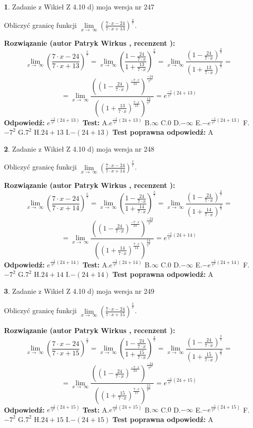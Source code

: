 \documentclass[12pt, a4paper]{article}
\theoremstyle{definition} %
\newtheorem{zad}{}
\newcommand{\zadStart}[1]{\begin{zad}#1\newline}
\newcommand{\zadStop}{\end{zad}}
\newcommand{\rozwStart}[2]{\noindent \textbf{Rozwiązanie (autor #1 , recenzent #2): }\newline}
\newcommand{\rozwStop}{\newline}
\newcommand{\odpStart}{\noindent \textbf{Odpowiedź:}\newline}
\newcommand{\odpStop}{\newline}
\newcommand{\testStart}{\noindent \textbf{Test:}\newline}
\newcommand{\testStop}{\newline}
\newcommand{\kluczStart}{\noindent \textbf{Test poprawna odpowiedź:}\newline}
\newcommand{\kluczStop}{\newline}
\begin{document}
\zadStart{Zadanie z Wikieł Z 4.10 d) moja wersja nr 247}


Obliczyć granicę funkcji  $\lim\limits_{x\to\ \infty}(\frac{7\cdot x-24}{7\cdot x+13})^{\frac{x}{7}}$.
\zadStop
\rozwStart{Patryk Wirkus}{}
$$\lim\limits_{x\to\ \infty}(\frac{7\cdot x-24}{7\cdot x+13})^{\frac{x}{7}} = \lim\limits_{x\to\ \infty}(\frac{1-\frac{24}{7\cdot x}}{1+\frac{13}{7\cdot x}})^{\frac{x}{7}}=\lim\limits_{x\to\ \infty}\frac{(1-\frac{24}{7\cdot x})^{\frac{x}{7}}}{(1+\frac{13}{7\cdot x})^{\frac{x}{7}}}=$$
$$=\lim\limits_{x\to\ \infty}\frac{((1-\frac{24}{7\cdot x})^{\frac{-7\cdot x}{24}})^{\frac{-24}{7^{2}}}}{((1+\frac{13}{7\cdot x})^{\frac{7\cdot x}{13}})^{\frac{13}{7^{2}}}}=e^{\frac{-1}{7^{2}}(24+13)}$$
\rozwStop
\odpStart
$e^{\frac{-1}{7^{2}}(24+13)}$
\odpStop
\testStart
A.$e^{\frac{-1}{7^{2}}(24+13)}$ B.$\infty$ C.$0$ D.$-\infty$ E.$-e^{\frac{-1}{7^{2}}(24+13)}$
F.$-7^{2}$ G.$7^{2}$
H.$24+13$
I.$-(24+13)$
\testStop
\kluczStart
A
\kluczStop



\zadStart{Zadanie z Wikieł Z 4.10 d) moja wersja nr 248}


Obliczyć granicę funkcji  $\lim\limits_{x\to\ \infty}(\frac{7\cdot x-24}{7\cdot x+14})^{\frac{x}{7}}$.
\zadStop
\rozwStart{Patryk Wirkus}{}
$$\lim\limits_{x\to\ \infty}(\frac{7\cdot x-24}{7\cdot x+14})^{\frac{x}{7}} = \lim\limits_{x\to\ \infty}(\frac{1-\frac{24}{7\cdot x}}{1+\frac{14}{7\cdot x}})^{\frac{x}{7}}=\lim\limits_{x\to\ \infty}\frac{(1-\frac{24}{7\cdot x})^{\frac{x}{7}}}{(1+\frac{14}{7\cdot x})^{\frac{x}{7}}}=$$
$$=\lim\limits_{x\to\ \infty}\frac{((1-\frac{24}{7\cdot x})^{\frac{-7\cdot x}{24}})^{\frac{-24}{7^{2}}}}{((1+\frac{14}{7\cdot x})^{\frac{7\cdot x}{14}})^{\frac{14}{7^{2}}}}=e^{\frac{-1}{7^{2}}(24+14)}$$
\rozwStop
\odpStart
$e^{\frac{-1}{7^{2}}(24+14)}$
\odpStop
\testStart
A.$e^{\frac{-1}{7^{2}}(24+14)}$ B.$\infty$ C.$0$ D.$-\infty$ E.$-e^{\frac{-1}{7^{2}}(24+14)}$
F.$-7^{2}$ G.$7^{2}$
H.$24+14$
I.$-(24+14)$
\testStop
\kluczStart
A
\kluczStop



\zadStart{Zadanie z Wikieł Z 4.10 d) moja wersja nr 249}


Obliczyć granicę funkcji  $\lim\limits_{x\to\ \infty}(\frac{7\cdot x-24}{7\cdot x+15})^{\frac{x}{7}}$.
\zadStop
\rozwStart{Patryk Wirkus}{}
$$\lim\limits_{x\to\ \infty}(\frac{7\cdot x-24}{7\cdot x+15})^{\frac{x}{7}} = \lim\limits_{x\to\ \infty}(\frac{1-\frac{24}{7\cdot x}}{1+\frac{15}{7\cdot x}})^{\frac{x}{7}}=\lim\limits_{x\to\ \infty}\frac{(1-\frac{24}{7\cdot x})^{\frac{x}{7}}}{(1+\frac{15}{7\cdot x})^{\frac{x}{7}}}=$$
$$=\lim\limits_{x\to\ \infty}\frac{((1-\frac{24}{7\cdot x})^{\frac{-7\cdot x}{24}})^{\frac{-24}{7^{2}}}}{((1+\frac{15}{7\cdot x})^{\frac{7\cdot x}{15}})^{\frac{15}{7^{2}}}}=e^{\frac{-1}{7^{2}}(24+15)}$$
\rozwStop
\odpStart
$e^{\frac{-1}{7^{2}}(24+15)}$
\odpStop
\testStart
A.$e^{\frac{-1}{7^{2}}(24+15)}$ B.$\infty$ C.$0$ D.$-\infty$ E.$-e^{\frac{-1}{7^{2}}(24+15)}$
F.$-7^{2}$ G.$7^{2}$
H.$24+15$
I.$-(24+15)$
\testStop
\kluczStart
A
\kluczStop
\end{document}
